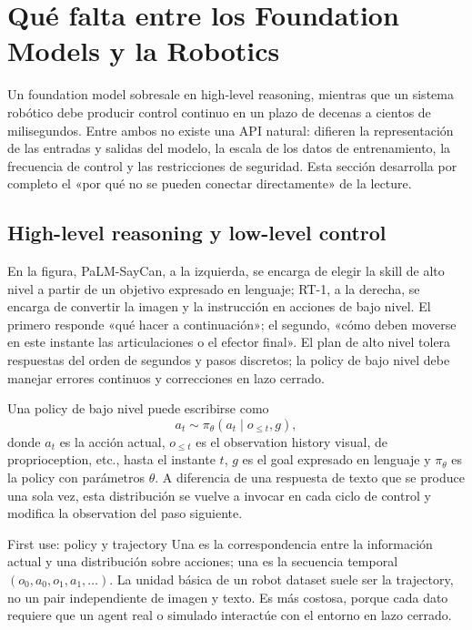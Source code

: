\section{Qué falta entre los Foundation Models y la Robotics}

Un foundation model sobresale en high-level reasoning, mientras que un sistema robótico debe producir control continuo en un plazo de decenas a cientos de milisegundos. Entre ambos no existe una API natural: difieren la representación de las entradas y salidas del modelo, la escala de los datos de entrenamiento, la frecuencia de control y las restricciones de seguridad. Esta sección desarrolla por completo el «por qué no se pueden conectar directamente» de la lecture.

\subsection{High-level reasoning y low-level control}

En la figura, PaLM-SayCan, a la izquierda, se encarga de elegir la skill de alto nivel a partir de un objetivo expresado en lenguaje; RT-1, a la derecha, se encarga de convertir la imagen y la instrucción en acciones de bajo nivel. El primero responde «qué hacer a continuación»; el segundo, «cómo deben moverse en este instante las articulaciones o el efector final». El plan de alto nivel tolera respuestas del orden de segundos y pasos discretos; la policy de bajo nivel debe manejar errores continuos y correcciones en lazo cerrado.


Una policy de bajo nivel puede escribirse como
$$
a_t\sim \pi_\theta(a_t\mid o_{\le t},g),
$$
donde $a_t$ es la acción actual, $o_{\le t}$ es el observation history visual, de proprioception, etc., hasta el instante $t$, $g$ es el goal expresado en lenguaje y $\pi_\theta$ es la policy con parámetros $\theta$. A diferencia de una respuesta de texto que se produce una sola vez, esta distribución se vuelve a invocar en cada ciclo de control y modifica la observation del paso siguiente.

\begin{importantbox}{First use: policy y trajectory}
Una  es la correspondencia entre la información actual y una distribución sobre acciones; una  es la secuencia temporal $(o_0,a_0,o_1,a_1,\ldots)$. La unidad básica de un robot dataset suele ser la trajectory, no un pair independiente de imagen y texto. Es más costosa, porque cada dato requiere que un agent real o simulado interactúe con el entorno en lazo cerrado.
\end{importantbox}

